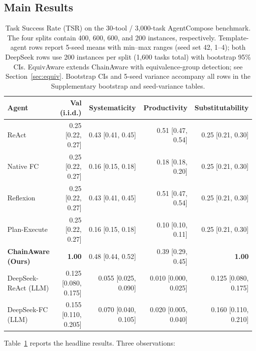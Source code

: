 ﻿\documentclass{article}
\begin{document}
\subsection{Main Results}

\begin{table}[t]
    \centering
    \small
    \begin{tabular}{lrrrr}
        \toprule
        Agent & Val (i.i.d.) & Systematicity & Productivity & Substitutability \\
        \midrule
        ReAct & 0.25 [0.22, 0.27] & 0.43 [0.41, 0.45] & 0.51 [0.47, 0.54] & 0.25 [0.21, 0.30] \\
        Native FC & 0.25 [0.22, 0.27] & 0.16 [0.15, 0.18] & 0.18 [0.18, 0.20] & 0.25 [0.21, 0.30] \\
        Reflexion & 0.25 [0.22, 0.27] & 0.43 [0.41, 0.45] & 0.51 [0.47, 0.54] & 0.25 [0.21, 0.30] \\
        Plan-Execute & 0.25 [0.22, 0.27] & 0.16 [0.15, 0.18] & 0.10 [0.10, 0.11] & 0.25 [0.21, 0.30] \\
        \textbf{ChainAware (Ours)} & \textbf{1.00} & 0.48 [0.44, 0.52] & 0.39 [0.29, 0.45] & \textbf{1.00} \\
        
        \midrule
        DeepSeek-ReAct (LLM) & 0.125 [0.080, 0.175] & 0.055 [0.025, 0.090] & 0.010 [0.000, 0.025] & 0.125 [0.080, 0.175] \\
        DeepSeek-FC (LLM) & 0.155 [0.110, 0.205] & 0.070 [0.040, 0.105] & 0.020 [0.005, 0.040] & 0.160 [0.110, 0.210] \\
        \bottomrule
    \end{tabular}
    \caption{Task Success Rate (TSR) on the 30-tool / 3{,}000-task AgentCompose benchmark. The four splits contain 400, 600, 600, and 200 instances, respectively. Template-agent rows report 5-seed means with min--max ranges (seed set 42, 1--4); both DeepSeek rows use 200 instances per split (1{,}600 tasks total) with bootstrap 95\% CIs. EquivAware extends ChainAware with equivalence-group detection; see Section~\ref{sec:equiv}. Bootstrap CIs and 5-seed variance accompany all rows in the Supplementary bootstrap and seed-variance tables.}
    \label{tab:main}
\end{table}

Table~\ref{tab:main} reports the headline results. Three observations:
\end{document}
